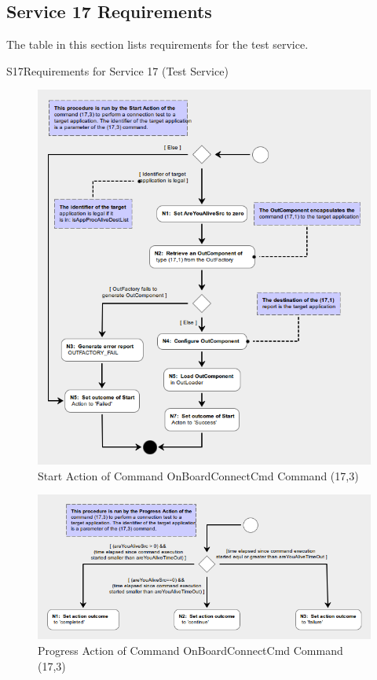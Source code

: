 \documentclass[a4paper,10pt]{article}
\newenvironment{cr_req}[2]
{
\begin{longtable}{|l|p{11.8cm}|}
\caption{#2}\label{tab:Req-#1} \\
\hline
\rowcolor{light-gray}
\textbf{Req. ID} & \textbf{Requirement Text}\\
\hline\hline
\endfirsthead
\rowcolor{light-gray}
\textbf{Req. ID} & \textbf{Requirement Text}\\
\hline\hline
\endhead
\DTLforeach*[\DTLiseq{\cat}{#1}]{dbReq}{\cat=Category,\type=Type,\id=Id,\reqText=Text}
{\DTLiffirstrow{}{\\\hline}P-\cat-\id/\type & \textit{\reqText}}\\\hline
}
{\end{longtable}}
\begin{document}
\subsection{Service 17 Requirements}
The table in this section lists requirements for the test service.

\begin{cr_req}{S17}{Requirements for Service 17 (Test Service)}
\end{cr_req}

\newpage
\begin{figure}[H]
 \centering
 \includegraphics[scale=0.415,keepaspectratio=true]{CrPsCmd17s3Start.png}
 \caption{Start Action of Command OnBoardConnectCmd Command (17,3)}
 \label{fig:Cmd17s3Start}
\end{figure}

\newpage
\begin{figure}[H]
 \centering
 \includegraphics[scale=0.415,keepaspectratio=true]{CrPsCmd17s3Prgr.png}
 \caption{Progress Action of Command OnBoardConnectCmd Command (17,3)}
 \label{fig:Cmd17s3Prgr}
\end{figure}
\end{document}
